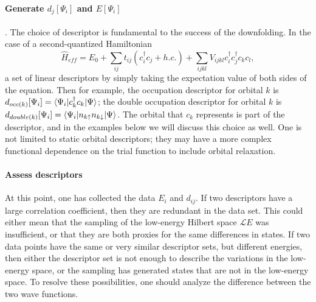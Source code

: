 \paragraph{Generate $d_j[\Psi_i]$ and $E[\Psi_i]$}. 
The choice of descriptor is fundamental to the success of the downfolding. 
In the case of a second-quantized Hamiltonian
\begin{equation}
\hat{H}_{eff} = E_0 + \sum_{ij} t_{ij} (c_i^\dagger c_j + h.c.) + \sum_{ijkl} V_{ijkl} c_i^\dagger c_j^\dagger c_k c_l,
\end{equation}
a set of linear descriptors by simply taking the expectation value of both sides of the equation. 
Then for example, the occupation descriptor for orbital $k$ is $d_{occ(k)}[\Psi_i] = \braket{\Psi_i | c_k^\dagger c_k | \Psi}$; the double occupation descriptor for orbital $k$ is $d_{double(k)}[\Psi_i] = \braket{\Psi_i | n_{k\uparrow}n_{k\downarrow} | \Psi}$. 
The orbital that $c_k$ represents is part of the descriptor, and in the examples below we will discuss this choice as well.
One is not limited to static orbital descriptors; they may have a more complex functional dependence on the trial function to include orbital relaxation.

 
\paragraph{Assess descriptors}
At this point, one has collected the data $E_i$ and $d_{ij}$. 
If two descriptors have a large correlation coefficient, then they are redundant in the data set. 
This could either mean that the sampling of the low-energy Hilbert space ${\mathcal LE}$ was insufficient, or that they are both proxies for the same differences in states. 
If two data points have the same or very similar descriptor sets, but different energies, then either the descriptor set is not enough to describe the variations in the low-energy space, or the sampling has generated states that are not in the low-energy space.
To resolve these possibilities, one should analyze the difference between the two wave functions.  



